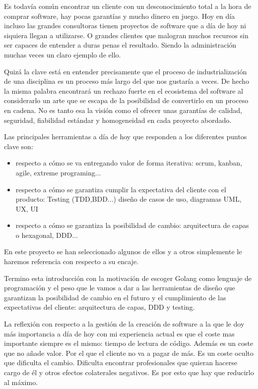 Es todavía común encontrar un cliente con un desconocimiento total a la hora de comprar software, hay pocas garantías y mucho dinero en juego. Hoy en día incluso las grandes consultoras tienen proyectos de software que a día de hoy ni siquiera llegan a utilizarse. O grandes clientes que malogran muchos recursos sin ser capaces de entender a duras penas el resultado. Siendo la administración muchas veces un claro ejemplo de ello.

Quizá la clave está en entender precisamente que el proceso de industrialización de una disciplina es un proceso más largo del que nos gustaría a veces. De hecho la misma palabra encontrará un rechazo fuerte en el ecosistema del software al considerarlo un arte que se escapa de la posibilidad de convertirlo en un proceso en cadena. No es tanto esa la visión como el ofrecer unas garantías de calidad, seguridad, fiabilidad estándar y homogeneidad en cada proyecto abordado.

Las principales herramientas a día de hoy que responden a los diferentes puntos clave son:

\begin{itemize}
	\item respecto a cómo se va entregando valor de forma iterativa: scrum, kanban, agile, extreme programing...
	\item respecto a cómo se garantiza cumplir la expectativa del cliente con el producto: Testing (TDD,BDD...) diseño de casos de uso, diagramas UML, UX, UI
	\item respecto a cómo se garantiza la posibilidad de cambio: arquitectura de capas o hexagonal, DDD... 
\end{itemize} 

En este proyecto se han seleccionado algunos de ellos y a otros simplemente le haremos referencia con respecto a su encaje.

Termino esta introducción con la motivación de escoger Golang como lenguaje de programación y el peso que le vamos a dar a las herramientas de diseño que garantizan la posibilidad de cambio en el futuro y el cumplimiento de las expectativas del cliente: arquitectura de capas, DDD y testing. 

La reflexión con respecto a la gestión de la creación de software a la que le doy más importancia a día de hoy con mi experiencia actual es que el coste mas importante siempre es el mismo: tiempo de lectura de código. Además es un coste que no añade valor. Por el que el cliente no va a pagar de más. Es un coste oculto que dificulta el cambio. Dificulta encontrar profesionales que quieran hacerse cargo de él y otros efectos colaterales negativos. Es por esto que hay que reducirlo al máximo.

